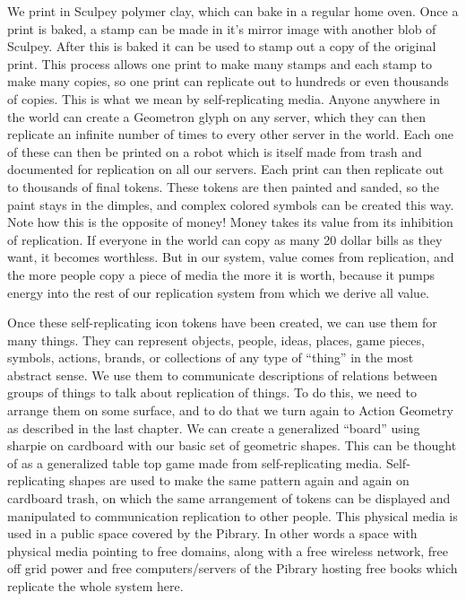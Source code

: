 We print in Sculpey polymer clay, which can bake in a regular home oven.
Once a print is baked, a stamp can be made in it's mirror image with
another blob of Sculpey. After this is baked it can be used to stamp out
a copy of the original print. This process allows one print to make many
stamps and each stamp to make many copies, so one print can replicate
out to hundreds or even thousands of copies. This is what we mean by
self-replicating media. Anyone anywhere in the world can create a
Geometron glyph on any server, which they can then replicate an infinite
number of times to every other server in the world. Each one of these
can then be printed on a robot which is itself made from trash and
documented for replication on all our servers. Each print can then
replicate out to thousands of final tokens. These tokens are then
painted and sanded, so the paint stays in the dimples, and complex
colored symbols can be created this way. Note how this is the opposite
of money! Money takes its value from its inhibition of replication. If
everyone in the world can copy as many 20 dollar bills as they want, it
becomes worthless. But in our system, value comes from replication, and
the more people copy a piece of media the more it is worth, because it
pumps energy into the rest of our replication system from which we
derive all value.

Once these self-replicating icon tokens have been created, we can use
them for many things. They can represent objects, people, ideas, places,
game pieces, symbols, actions, brands, or collections of any type of
``thing'' in the most abstract sense. We use them to communicate
descriptions of relations between groups of things to talk about
replication of things. To do this, we need to arrange them on some
surface, and to do that we turn again to Action Geometry as described in
the last chapter. We can create a generalized ``board'' using sharpie on
cardboard with our basic set of geometric shapes. This can be thought of
as a generalized table top game made from self-replicating media.
Self-replicating shapes are used to make the same pattern again and
again on cardboard trash, on which the same arrangement of tokens can be
displayed and manipulated to communication replication to other people.
This physical media is used in a public space covered by the Pibrary. In
other words a space with physical media pointing to free domains, along
with a free wireless network, free off grid power and free
computers/servers of the Pibrary hosting free books which replicate the
whole system here.

